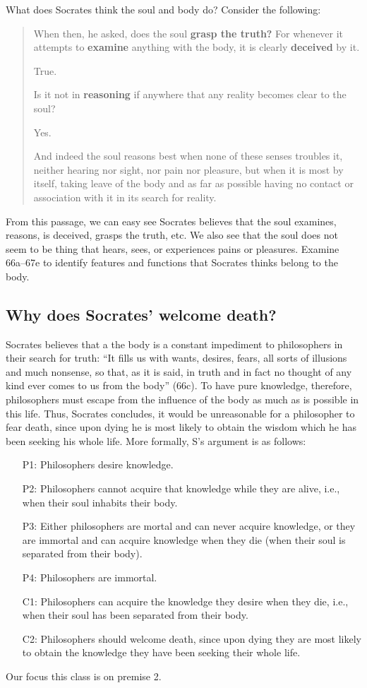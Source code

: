 \documentclass[oneside]{article}
\begin{document}
What does Socrates think the soul and body do? Consider the following: 
\begin{quotation}
When then, he asked, does the soul \textbf{grasp the truth?} For whenever it attempts to \textbf{examine} anything with the body, it is clearly \textbf{deceived} by it.

True.

Is it not in \textbf{reasoning} if anywhere that any reality becomes clear to the soul?

Yes.

And indeed the soul reasons best when none of these senses troubles it, neither hearing nor sight, nor pain nor pleasure, but when it is most by itself, taking leave of the body and as far as possible having no contact or association with it in its search for reality.

\end{quotation}
From this passage, we can easy see Socrates believes that the soul examines, reasons, is deceived, grasps the truth, etc. We also see that the soul does not seem to be thing that hears, sees, or experiences pains or pleasures.  Examine 66a--67e to identify features and functions that Socrates thinks belong to the body. 

\subsection*{Why does Socrates' welcome death?}
Socrates believes that a the body is a constant impediment to philosophers in their search for truth: “It fills us with wants, desires, fears, all sorts of illusions and much nonsense, so that, as it is said, in truth and in fact no thought of any kind ever comes to us from the body” (66c).  To have pure knowledge, therefore, philosophers must escape from the influence of the body as much as is possible in this life. Thus, Socrates concludes, it would be unreasonable for a philosopher to fear death, since upon dying he is most likely to obtain the wisdom which he has been seeking his whole life. More formally, S's argument is as follows:

\begin{itemize}
\item[P1:] Philosophers desire knowledge.
\item[P2:] Philosophers cannot acquire that knowledge while they are alive, i.e., when their soul inhabits their body.
\item[P3:] Either philosophers are mortal and can never acquire knowledge, or they are immortal and can acquire knowledge when they die (when their soul is separated from their body).
\item[P4:] Philosophers are immortal. 
\item[C1:] Philosophers can acquire the knowledge they desire when they die, i.e., when their soul has been separated from their body.
\item[C2:] Philosophers should welcome death, since upon dying they are most likely to obtain the knowledge they have been seeking their whole life.
\end{itemize}
Our focus this class is on premise 2.
\end{document}
